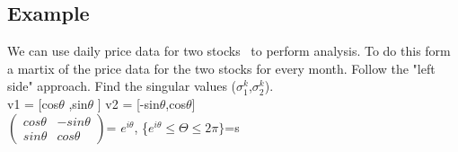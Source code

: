 \documentclass[11pt, oneside]{article}   	%
\begin{document}
\begin{Large}
\section*{Example}
We can use daily price data for two stocks  to perform analysis. To do this form a martix of the price data for the two stocks for every month. Follow the "left side" approach. Find the singular values ($\sigma_1^k$,$\sigma_2^k$).\\
 v1 = [cos$\theta$ ,sin$\theta$ ] v2 = [-sin$\theta$,cos$\theta$]\\

$\begin{pmatrix}
cos\theta & -sin\theta\\
sin\theta& cos\theta    
\end{pmatrix}$= $e^{i\theta}$, \{$e^{i\theta}$$\leq\Theta\leq2\pi\}$=s


\end{Large}
\end{document}
